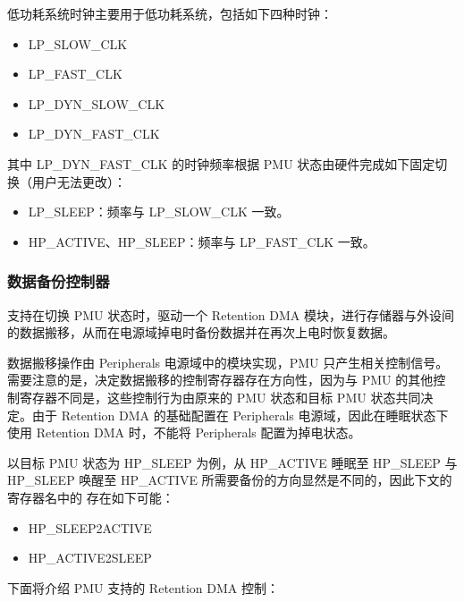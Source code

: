 \documentclass[main\_\_CN.tex]{subfiles}
\begin{document}
\begin{itemize}
\end{itemize}

低功耗系统时钟主要用于低功耗系统，包括如下四种时钟：

    \begin{itemize}
    \item LP\_SLOW\_CLK
    \item LP\_FAST\_CLK
    \item LP\_DYN\_SLOW\_CLK
    \item LP\_DYN\_FAST\_CLK
    \end{itemize}

其中 LP\_DYN\_FAST\_CLK 的时钟频率根据 PMU 状态由硬件完成如下固定切换（用户无法更改）：

    \begin{itemize}
    \item LP\_SLEEP：频率与 LP\_SLOW\_CLK 一致。
    \item HP\_ACTIVE、HP\_SLEEP：频率与 LP\_FAST\_CLK 一致。
    \end{itemize}

\subsubsection{数据备份控制器}

\chipname{} 支持在切换 PMU 状态时，驱动一个 Retention DMA 模块，进行存储器与外设间的数据搬移，从而在电源域掉电时备份数据并在再次上电时恢复数据。

数据搬移操作由 Peripherals 电源域中的模块实现，PMU 只产生相关控制信号。需要注意的是，决定数据搬移的控制寄存器存在方向性，因为与 PMU 的其他控制寄存器不同是，这些控制行为由原来的 PMU 状态和目标 PMU 状态共同决定。由于 Retention DMA 的基础配置在 Peripherals 电源域，因此在睡眠状态下使用 Retention DMA 时，不能将 Peripherals 配置为掉电状态。

以目标 PMU 状态为 HP\_SLEEP 为例，从 HP\_ACTIVE 睡眠至 HP\_SLEEP 与 HP\_SLEEP 唤醒至 HP\_ACTIVE 所需要备份的方向显然是不同的，因此下文的寄存器名中的  存在如下可能：

\begin{itemize}
    \item HP\_SLEEP2ACTIVE
    \item HP\_ACTIVE2SLEEP
\end{itemize}

下面将介绍 PMU 支持的 Retention DMA 控制：
\end{document}
